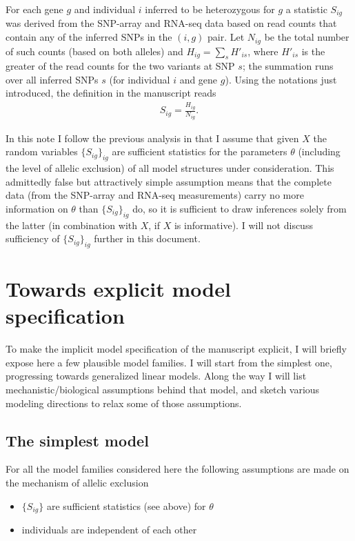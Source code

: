 \documentclass[letterpaper]{article}
\begin{document}
For each gene $g$ and individual $i$ inferred to be heterozygous for \(g\) a
statistic $S_{ig}$ was derived from the SNP-array and RNA-seq data based on
read counts that contain any of the inferred SNPs in the \((i,g)\) pair.  Let
\(N_{ig}\) be the total number of such counts (based on both alleles) and
\(H_{ig} = \sum_{s} H'_{is}\), where \(H'_{is}\) is the greater of the read
counts for the two variants at SNP \(s\); the summation runs over all inferred
SNPs \(s\) (for individual \(i\) and gene \(g\)).  Using the notations just
introduced, the definition in the manuscript
reads
\begin{eqnarray*}
\label{eq:S}
S_{ig} = \frac{H_{ig}}{N_{ig}}.
\end{eqnarray*}

In this note I follow the previous analysis in that I assume
that given $X$ the random variables $\{S_{ig}\}_{ig}$ are sufficient
statistics for the parameters $\theta$ (including the level of allelic
exclusion) of all model structures under consideration.  This admittedly false
but attractively simple assumption means that the complete data (from the
SNP-array and RNA-seq measurements) carry no more information on $\theta$ than
$\{S_{ig}\}_{ig}$ do, so it is sufficient to draw inferences solely from the
latter (in combination with $X$, if $X$ is informative).  I will not discuss
sufficiency of $\{S_{ig}\}_{ig}$ further in this document.

\section{Towards explicit model specification}

To make the implicit model specification of the manuscript explicit, I will briefly expose here a
few plausible model families.  I will start from the simplest one, progressing towards generalized
linear models.  Along the way I will list mechanistic/biological assumptions behind that model, and
sketch various modeling directions to relax some of those assumptions.

\subsection{The simplest model}

For all the model families considered here the following assumptions are made
on the mechanism of allelic exclusion
\begin{itemize}
\item $\{S_{ig}\}$ are sufficient statistics (see above) for $\theta$
\item individuals are independent of each other
\end{itemize}
\end{document}
